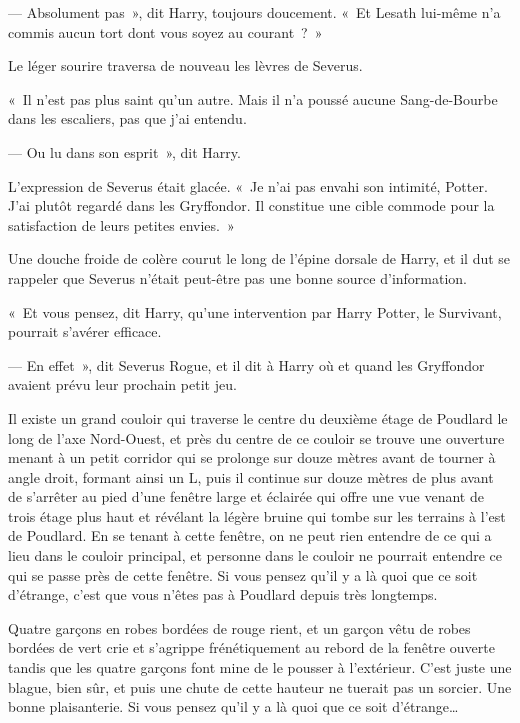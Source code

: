 --- Absolument pas~», dit Harry, toujours doucement.
«~Et Lesath lui-même n'a commis aucun tort dont vous soyez au courant~?~»

Le léger sourire traversa de nouveau les lèvres de Severus.

«~Il n'est pas plus saint qu'un autre.
Mais il n'a poussé aucune Sang-de-Bourbe dans les escaliers, pas que j'ai entendu.

--- Ou lu dans son esprit~», dit Harry.

L'expression de Severus était glacée.
«~Je n'ai pas envahi son intimité, Potter.
J'ai plutôt regardé dans les Gryffondor.
Il constitue une cible commode pour la satisfaction de leurs petites envies.~»

Une douche froide de colère courut le long de l'épine dorsale de Harry, et il dut se rappeler que Severus n'était peut-être pas une bonne source d'information.

«~Et vous pensez, dit Harry, qu'une intervention par Harry Potter, le Survivant, pourrait s'avérer efficace.

--- En effet~», dit Severus Rogue, et il dit à Harry où et quand les Gryffondor avaient prévu leur prochain petit jeu.

\later

Il existe un grand couloir qui traverse le centre du deuxième étage de Poudlard le long de l'axe Nord-Ouest, et près du centre de ce couloir se trouve une ouverture menant à un petit corridor qui se prolonge sur douze mètres avant de tourner à angle droit, formant ainsi un L, puis il continue sur douze mètres de plus avant de s'arrêter au pied d'une fenêtre large et éclairée qui offre une vue venant de trois étage plus haut et révélant la légère bruine qui tombe sur les terrains à l'est de Poudlard.
En se tenant à cette fenêtre, on ne peut rien entendre de ce qui a lieu dans le couloir principal, et personne dans le couloir ne pourrait entendre ce qui se passe près de cette fenêtre.
Si vous pensez qu'il y a là quoi que ce soit d'étrange, c'est que vous n'êtes pas à Poudlard depuis très longtemps.

Quatre garçons en robes bordées de rouge rient, et un garçon vêtu de robes bordées de vert crie et s'agrippe frénétiquement au rebord de la fenêtre ouverte tandis que les quatre garçons font mine de le pousser à l'extérieur.
C'est juste une blague, bien sûr, et puis une chute de cette hauteur ne tuerait pas un sorcier.
Une bonne plaisanterie.
Si vous pensez qu'il y a là quoi que ce soit d'étrange…


